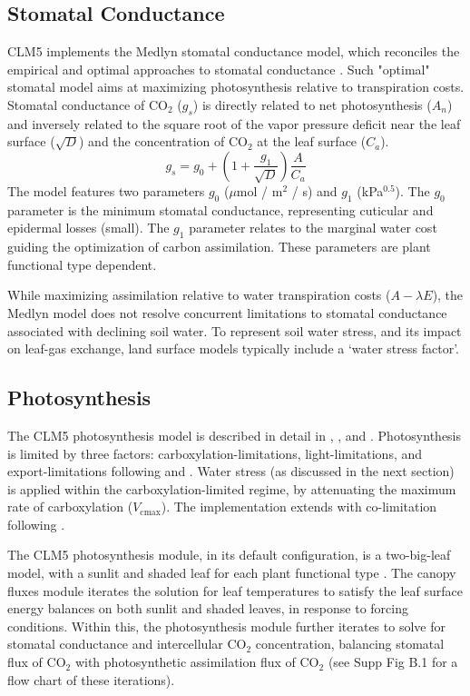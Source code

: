 \documentclass[draft,linenumbers]{agujournal}
\begin{document}
\subsection{Stomatal Conductance}
\label{sect:gs}
    CLM5 implements the Medlyn stomatal conductance model, which reconciles the empirical and optimal approaches to 
    stomatal conductance \citep{medlyn2011}.
    Such "optimal" stomatal model aims at maximizing photosynthesis relative to transpiration costs. 
    Stomatal conductance of CO$_2$ ($g_s$) is directly related to net photosynthesis ($A_n$) 
    and inversely related to the square root of the vapor pressure deficit near the leaf surface ($\sqrt{D}$) and the concentration of CO$_2$ at the leaf surface ($C_a$).
    \begin{equation}
    g_s=g_0+\left(1+\dfrac{g_1}{\sqrt{D}}\right)\dfrac{A}{C_a}
    \end{equation}
    The model features two parameters $g_0$ ($\mu$mol / m$^2$ / s) and $g_1$ (kPa$^{0.5}$). 
    The $g_0$ parameter is the minimum stomatal conductance, representing cuticular and epidermal losses (small). 
    The $g_1$ parameter relates to the marginal water cost guiding the optimization of carbon assimilation. 
    These parameters are plant functional type dependent.
    
    While maximizing assimilation relative to water transpiration costs ($A-\lambda E$), the Medlyn model does not 
    resolve concurrent limitations to stomatal conductance associated with declining soil water. 
    To represent soil water stress, and its impact on leaf-gas exchange, land surface models typically include a `water stress factor'. 

\subsection{Photosynthesis}
\label{sect:A}
    The CLM5 photosynthesis model is described in detail in \citet{bonan2011}, \citet{thornton2007},
    and \citet{oleson2013}. Photosynthesis is limited by three factors: carboxylation-limitations, light-limitations, and export-limitations 
    following \citet{farquhar1980} and \citet{harley1992}. Water stress (as discussed in the next section) is applied within the carboxylation-limited regime, by attenuating the maximum rate of carboxylation ($V_{\text{cmax}}$). The implementation extends \citet{sellers1996a,sellers1996b} with 
    co-limitation following \citet{collatz1991}. 
    
    The CLM5 photosynthesis module, in its default configuration, is a two-big-leaf model, with a sunlit and shaded leaf for each plant functional type \citep{thornton2007, dai2004, oleson2013}. 
    The canopy fluxes module iterates the solution for leaf temperatures to satisfy the leaf surface energy balances on both sunlit and shaded leaves, in response to forcing conditions.
    Within this, the photosynthesis module further iterates to solve for stomatal conductance and intercellular CO$_2$ concentration, balancing stomatal flux of CO$_2$ with photosynthetic assimilation flux of CO$_2$ (see Supp Fig B.1 for a flow chart of these iterations).
\end{document}

